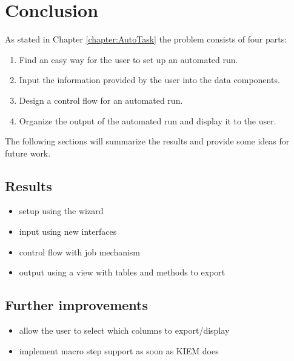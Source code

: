 \chapter{Conclusion}
\label{chapter:AutoConclusion}
As stated in Chapter \ref{chapter:AutoTask} the problem consists of four parts:
\begin{enumerate}
 \item Find an easy way for the user to set up an automated run.
 \item Input the information provided by the user into the data components.
 \item Design a control flow for an automated run.
 \item Organize the output of the automated run and display it to the user.
\end{enumerate}
The following sections will summarize the results and provide some ideas for
future work.

\section{Results}
\label{section:AutoResults}
\begin{itemize}
 \item setup using the wizard
 \item input using new interfaces
 \item control flow with job mechanism
 \item output using a view with tables and methods to export
\end{itemize}


\section{Further improvements}
\label{section:AutoImprovements}
\begin{itemize}
 \item allow the user to select which columns to export/display
 \item implement macro step support as soon as KIEM does
\end{itemize}
